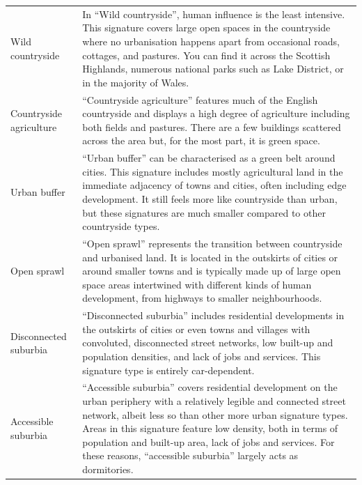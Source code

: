 \documentclass[fleqn,10pt]{wlscirep}
\begin{document}
\begin{longtable}{p{}p{}}
    Wild countryside                     &                                                                                       In “Wild countryside”, human influence is the least intensive. This signature covers large open spaces in the countryside where no urbanisation happens apart from occasional roads, cottages, and pastures. You can find it across the Scottish Highlands, numerous national parks such as Lake District, or in the majority of Wales. \\
    Countryside agriculture              &                                                                                                                                                                               “Countryside agriculture” features much of the English countryside and displays a high degree of agriculture including both fields and pastures. There are a few buildings scattered across the area but, for the most part, it is green space. \\
    Urban buffer                         &                                                                                             “Urban buffer” can be characterised as a green belt around cities. This signature includes mostly agricultural land in the immediate adjacency of towns and cities, often including edge development. It still feels more like countryside than urban, but these signatures are much smaller compared to other countryside types. \\
    Open sprawl                          &                                                                                                                           “Open sprawl” represents the transition between countryside and urbanised land. It is located in the outskirts of cities or around smaller towns and is typically made up of large open space areas intertwined with different kinds of human development, from highways to smaller neighbourhoods. \\
    Disconnected suburbia                &                                                                                                                                           “Disconnected suburbia” includes residential developments in the outskirts of cities or even towns and villages with convoluted, disconnected street networks, low built-up and population densities, and lack of jobs and services. This signature type is entirely car-dependent. \\
    Accessible suburbia                  &                                        “Accessible suburbia” covers residential development on the urban periphery with a relatively legible and connected street network, albeit less so than other more urban signature types. Areas in this signature feature low density, both in terms of population and built-up area, lack of jobs and services. For these reasons, “accessible suburbia” largely acts as dormitories. \\

\end{longtable}
\end{document}
